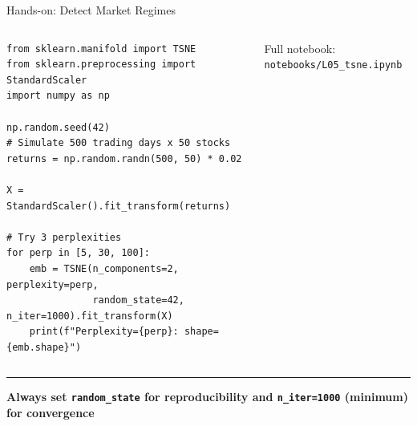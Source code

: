 \documentclass[8pt,aspectratio=169]{beamer}
\newcommand{\bottomnote}[1]{%
\vfill
\vspace{-2mm}
\textcolor{mllavender2}{\rule{\textwidth}{0.4pt}}
\vspace{1mm}
\footnotesize
\textbf{#1}
}
\begin{document}
\begin{frame}[fragile,t]{Hands-on: Detect Market Regimes}
\begin{columns}[T]
\small

\vspace{2mm}
\begin{verbatim}
from sklearn.manifold import TSNE
from sklearn.preprocessing import StandardScaler
import numpy as np

np.random.seed(42)
# Simulate 500 trading days x 50 stocks
returns = np.random.randn(500, 50) * 0.02

X = StandardScaler().fit_transform(returns)

# Try 3 perplexities
for perp in [5, 30, 100]:
    emb = TSNE(n_components=2, perplexity=perp,
               random_state=42, n_iter=1000).fit_transform(X)
    print(f"Perplexity={perp}: shape={emb.shape}")
\end{verbatim}

\vspace{1mm}
\scriptsize Full notebook: \texttt{notebooks/L05\_tsne.ipynb}
\end{columns}

\bottomnote{Always set \texttt{random\_state} for reproducibility and \texttt{n\_iter=1000} (minimum) for convergence}
\end{frame}
\end{document}
